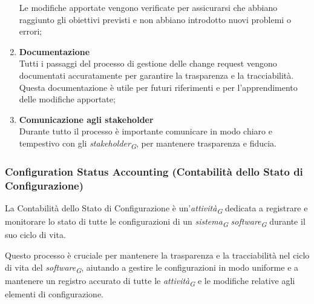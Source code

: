 \begin{enumerate}
    Le modifiche apportate vengono verificate per assicurarsi che abbiano raggiunto gli obiettivi previsti e non abbiano introdotto nuovi problemi o errori;
    \item \textbf{Documentazione} \\
    Tutti i passaggi del processo di gestione delle change request vengono documentati accuratamente per garantire la trasparenza e la tracciabilità. Questa documentazione è utile per futuri riferimenti e per l'apprendimento delle modifiche apportate;
    \item \textbf{Comunicazione agli stakeholder} \\Durante tutto il processo è importante comunicare in modo chiaro e tempestivo con gli \textit{stakeholder}\textsubscript{\textit{G}}, per mantenere trasparenza e fiducia.
\end{enumerate}

\subsubsection{Configuration Status Accounting (Contabilità dello Stato di Configurazione)}
La Contabilità dello Stato di Configurazione è un'\textit{attività}\textsubscript{\textit{G}} dedicata a registrare e monitorare lo stato di tutte le configurazioni di un \textit{sistema}\textsubscript{\textit{G}} \textit{software}\textsubscript{\textit{G}} durante il suo ciclo di vita.

Questo processo è cruciale per mantenere la trasparenza e la tracciabilità nel ciclo di vita del \textit{software}\textsubscript{\textit{G}}, aiutando a gestire le configurazioni in modo uniforme e a mantenere un registro accurato di tutte le \textit{attività}\textsubscript{\textit{G}} e le modifiche relative agli elementi di configurazione.\\

